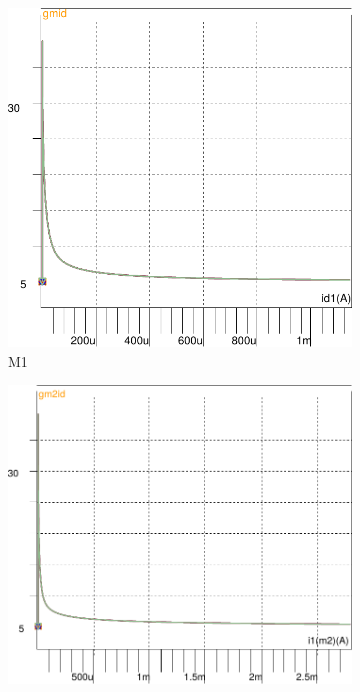 \begin{figure}[!tbp]
   \begin{subfigure}[b]{0.3\textwidth}
       \includegraphics[width=\textwidth]{images/gmid_id_m1}
   \caption{M1}
   \label{fig:f1}
   \end{subfigure}
   \begin{subfigure}[b]{0.34\textwidth}
   \includegraphics[width=\textwidth]{images/gmid_id_m2}

\end{subfigure}
\end{figure}
